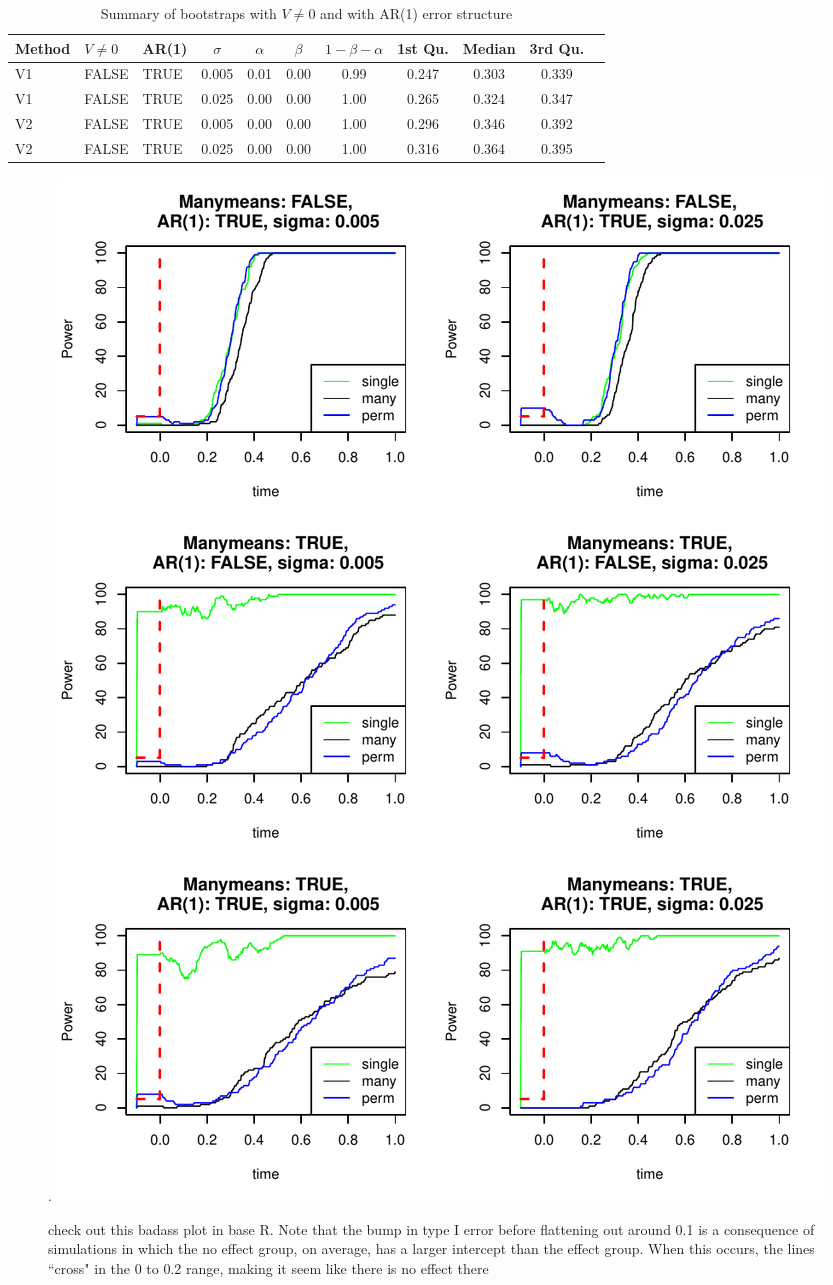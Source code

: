 \documentclass{article}
\begin{document}
\begin{table}[H]
\centering
\begin{tabular}{lllcccccccc}
  \hline
Method & $V \not= 0$ & AR(1) & $\sigma$  & $\alpha$ & $\beta$ & $1 - \beta - \alpha$  & 1st Qu. & Median & 3rd Qu.  \\ 
  \hline
V1 & FALSE & TRUE & 0.005 & 0.01 & 0.00 & 0.99 & 0.247 & 0.303 & 0.339 \\ 
  V1 & FALSE & TRUE & 0.025 & 0.00 & 0.00 & 1.00 & 0.265 & 0.324 & 0.347 \\ 
  V2 & FALSE & TRUE & 0.005 & 0.00 & 0.00 & 1.00 & 0.296 & 0.346 & 0.392 \\ 
  V2 & FALSE & TRUE & 0.025 & 0.00 & 0.00 & 1.00 & 0.316 & 0.364 & 0.395 \\ 
   \hline
\end{tabular}
\caption{Summary of bootstraps with $V \not=0$ and with AR(1) error structure}
\label{tab:best_case}
\end{table}


\begin{figure}[H]
\centering.
\includegraphics[width=\textwidth]{type_two_err_time_slice.pdf}
\caption{check out this badass plot in base R. Note that the bump in type I error before flattening out around 0.1 is a consequence of simulations in which the no effect group, on average, has a larger intercept than the effect group. When this occurs, the lines ``cross" in the 0 to 0.2 range, making it seem like there is no effect there}
\label{fig:time_power_plot}
\end{figure}
\end{document}

